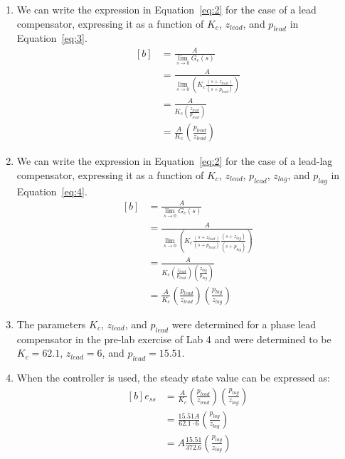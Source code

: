 \documentclass[12pt]{article}
\begin{document}
\begin{enumerate}
	\item %
	We can write the expression in Equation~\ref{eq:2} for the case of a lead compensator, expressing it as a function of $K_c$, $z_{lead}$, and $p_{lead}$ in Equation~\ref{eq:3}.
	\begin{equation} \label{eq:3}
	\begin{aligned}[b]
		&= \frac{A}{\lim_{s \to 0}G_c(s)} \\
		&= \frac{A}{\lim_{s \to 0} \left( K_c \frac{(s+z_{lead})}{(s+p_{lead})} \right)} \\
		&= \frac{A}{K_c \left( \frac{z_{lead}}{p_{lead}} \right)} \\
		&= \frac{A}{K_c} \left( \frac{p_{lead}}{z_{lead}} \right)
	\end{aligned}
	\end{equation}
	
	\item %
	We can write the expression in Equation~\ref{eq:2} for the case of a lead-lag compensator, expressing it as a function of $K_c$, $z_{lead}$, $p_{lead}$, $z_{lag}$, and $p_{lag}$ in Equation~\ref{eq:4}.
	\begin{equation} \label{eq:4}
		\begin{aligned}[b]
			&= \frac{A}{\lim_{s \to 0}G_c(s)} \\
			&= \frac{A}{\lim_{s \to 0} \left( K_c \frac{(s+z_{lead})}{(s+p_{lead})} \frac{(s+z_{lag})}{(s+p_{lag})} \right)} \\
			&= \frac{A}{K_c \left ( \frac{z_{lead}}{p_{lead}} \right) \left( \frac{z_{lag}}{p_{lag}} \right)} \\
			&= \frac{A}{K_c} \left( \frac{p_{lead}}{z_{lead}} \right) \left( \frac{p_{lag}}{z_{lag}} \right)
		\end{aligned}
		\end{equation}
	
	\item %
	The parameters $K_c$, $z_{lead}$, and $p_{lead}$ were determined for a phase lead compensator in the pre-lab exercise of Lab 4 and were determined to be $K_c = 62.1$, $z_{lead} = 6$, and $p_{lead} = 15.51$.
	
	\item %
	When the controller is used, the steady state value can be expressed as:
	\begin{equation} \label{eq:6}
	\begin{aligned}[b]
		e_{ss} &= \frac{A}{K_c} \left( \frac{p_{lead}}{z_{lead}} \right) \left( \frac{p_{lag}}{z_{lag}} \right) \\
		&= \frac{15.51 A}{62.1 \cdot 6} \left( \frac{p_{lag}}{z_{lag}} \right) \\
		&= A \frac{15.51}{372.6} \left( \frac{p_{lag}}{z_{lag}} \right)
	\end{aligned}
	\end{equation}


\end{enumerate}
\end{document}
